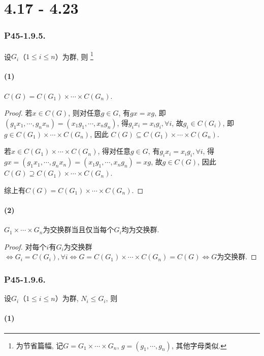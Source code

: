 \documentclass[12pt, a4paper, fontset=windows]{ctexart}
\newcommand{\kh}[1]{（{#1}）} %
\begin{document}
\part{4.17 - 4.23}
{
\def\timess{\times\cdots\times}
\section*{P45-1.9.5.}

设$G_i$\kh{$1\le i\le n$}为群, 则
\footnote{为节省篇幅, 记$G=G_1\timess G_n$, $g=(g_1,\cdots,g_n)$, 其他字母类似. }

\subsection*{(1)}

$C(G)=C(G_1)\timess C(G_n)$. 

\begin{proof}
若$x\in C(G)$, 则对任意$g\in G$, 
有$gx=xg$, 即$(g_1x_1,\cdots,g_nx_n)=(x_1g_1,\cdots,x_ng_n)$, 
得$g_ix_i=x_ig_i,\forall i$, 故$g_i\in C(G_i)$, 即
$g\in C(G_1)\timess C(G_n)$, 因此
$C(G)\subseteq C(G_1)\timess C(G_n)$. 

若$x\in C(G_1)\timess C(G_n)$, 得对任意$g\in G$, 
有$g_ix_i=x_ig_i,\forall i$, 得$gx=(g_1x_1,\cdots,g_nx_n)
=(x_1g_1,\cdots,x_ng_n)=xg$, 故$g\in C(G)$, 
因此$C(G)\supseteq C(G_1)\timess C(G_n)$. 

综上有$C(G)=C(G_1)\timess C(G_n)$. 
\end{proof}

\subsection*{(2)}

$G_1\timess G_n$为交换群当且仅当每个$G_i$均为交换群. 

\begin{proof}
对每个$i$有$G_i$为交换群$\iff G_i=C(G_i),\forall i\iff 
G=C(G_1)\timess C(G_n)=C(G)\iff G$为交换群. 
\end{proof}

\section*{P45-1.9.6.}

设$G_i$\kh{$1\le i\le n$}为群, $N_i\le G_i$, 则

\subsection*{(1)}

}
\end{document}

